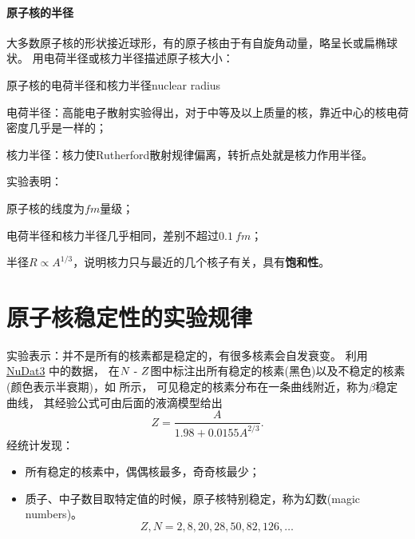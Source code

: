 \paragraph{原子核的半径}

大多数原子核的形状接近球形，有的原子核由于有自旋角动量，略呈长或扁椭球状。
用电荷半径或核力半径描述原子核大小：
\begin{definition}
	{原子核的电荷半径和核力半径}{nuclear radius}
	\begin{compactitem}
		\item 电荷半径：高能电子散射实验得出，对于中等及以上质量的核，靠近中心的核电荷密度几乎是一样的；
		\item 核力半径：核力使Rutherford散射规律偏离，转折点处就是核力作用半径。
	\end{compactitem}
\end{definition}
实验表明：
\begin{compactenum}
	\item 原子核的线度为$\si{fm}$量级；
	\item 电荷半径和核力半径几乎相同，差别不超过$\SI{0.1}{fm}$；
	\item 半径$R\propto A^{1/3}$，说明核力只与最近的几个核子有关，具有\textbf{饱和性}。
\end{compactenum}

\section{原子核稳定性的实验规律}

实验表示：并不是所有的核素都是稳定的，有很多核素会自发衰变。
利用 \href{https://www.nndc.bnl.gov/nudat3/}{NuDat3} 中的数据，
在$N~\text{-}~ Z$图中标注出所有稳定的核素(黑色)以及不稳定的核素(颜色表示半衰期)，如 所示，
可见稳定的核素分布在一条曲线附近，称为$\beta$稳定曲线，
其经验公式可由后面的液滴模型给出
\begin{equation}
	Z=\frac A{1.98 + 0.0155A^{2/3}}.
\end{equation}
经统计发现：
\begin{itemize}
	\item 所有稳定的核素中，偶偶核最多，奇奇核最少；
	\item 质子、中子数目取特定值的时候，原子核特别稳定，称为幻数(magic numbers)。
	\begin{equation}
		Z,N=2,8,20,28,50,82,126,\ldots
	\end{equation}
\end{itemize}

